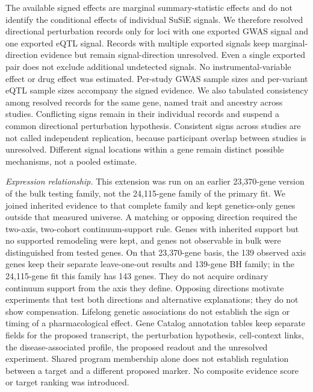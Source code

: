 The available signed effects are marginal summary-statistic effects and do not identify the conditional effects of individual SuSiE signals. We therefore resolved directional perturbation records only for loci with one exported GWAS signal and one exported eQTL signal. Records with multiple exported signals keep marginal-direction evidence but remain signal-direction unresolved. Even a single exported pair does not exclude additional undetected signals. No instrumental-variable effect or drug effect was estimated. Per-study GWAS sample sizes and per-variant eQTL sample sizes accompany the signed evidence. We also tabulated consistency among resolved records for the same gene, named trait and ancestry across studies. Conflicting signs remain in their individual records and suspend a common directional perturbation hypothesis. Consistent signs across studies are not called independent replication, because participant overlap between studies is unresolved. Different signal locations within a gene remain distinct possible mechanisms, not a pooled estimate.

\emph{Expression relationship.} This extension was run on an earlier 23,370-gene version of the bulk testing family, not the 24,115-gene family of the primary fit. We joined inherited evidence to that complete family and kept genetics-only genes outside that measured universe. A matching or opposing direction required the two-axis, two-cohort continuum-support rule. Genes with inherited support but no supported remodeling were kept, and genes not observable in bulk were distinguished from tested genes. On that 23,370-gene basis, the 139 observed axis genes keep their separate leave-one-out results and 139-gene BH family; in the 24,115-gene fit this family has 143 genes. They do not acquire ordinary continuum support from the axis they define. Opposing directions motivate experiments that test both directions and alternative explanations; they do not show compensation. Lifelong genetic associations do not establish the sign or timing of a pharmacological effect. Gene Catalog annotation tables keep separate fields for the proposed transcript, the perturbation hypothesis, cell-context links, the disease-associated profile, the proposed readout and the unresolved experiment. Shared program membership alone does not establish regulation between a target and a different proposed marker. No composite evidence score or target ranking was introduced.

